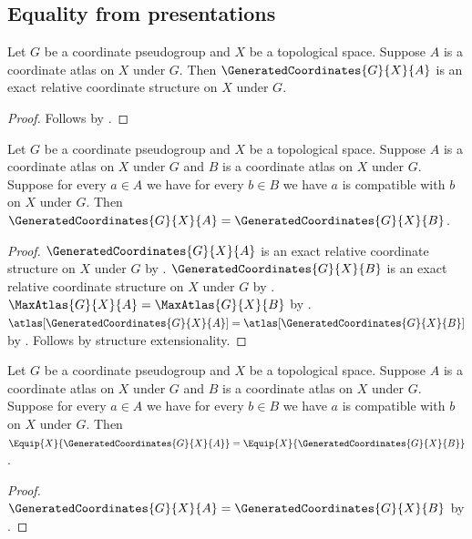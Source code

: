 \subsection{Equality from presentations}

\begin{theorem}\label{generated_coordinates_is_exact}
    Let $G$ be a coordinate pseudogroup and $X$ be a topological space.
    Suppose $A$ is a coordinate atlas on $X$ under $G$.
    Then $\GeneratedCoordinates{G}{X}{A}$ is an exact relative coordinate structure
        on $X$ under $G$.
\end{theorem}
\begin{proof}
    Follows by .
\end{proof}

\begin{theorem}\label{generated_coordinates_equal}
    Let $G$ be a coordinate pseudogroup and $X$ be a topological space.
    Suppose $A$ is a coordinate atlas on $X$ under $G$ and
        $B$ is a coordinate atlas on $X$ under $G$.
    Suppose for every $a\in A$ we have for every $b\in B$ we have
        $a$ is compatible with $b$ on $X$ under $G$.
    Then $\GeneratedCoordinates{G}{X}{A}=\GeneratedCoordinates{G}{X}{B}$.
\end{theorem}
\begin{proof}
    $\GeneratedCoordinates{G}{X}{A}$ is an exact relative coordinate structure
        on $X$ under $G$ by .
    $\GeneratedCoordinates{G}{X}{B}$ is an exact relative coordinate structure
        on $X$ under $G$ by .
    $\MaxAtlas{G}{X}{A}=\MaxAtlas{G}{X}{B}$ by .
    $\atlas[\GeneratedCoordinates{G}{X}{A}]=\atlas[\GeneratedCoordinates{G}{X}{B}]$
        by .
    Follows by structure extensionality.
\end{proof}

\begin{theorem}\label{equipped_presentations_equal}
    Let $G$ be a coordinate pseudogroup and $X$ be a topological space.
    Suppose $A$ is a coordinate atlas on $X$ under $G$ and
        $B$ is a coordinate atlas on $X$ under $G$.
    Suppose for every $a\in A$ we have for every $b\in B$ we have
        $a$ is compatible with $b$ on $X$ under $G$.
    Then $\Equip{X}{\GeneratedCoordinates{G}{X}{A}}
        =\Equip{X}{\GeneratedCoordinates{G}{X}{B}}$.
\end{theorem}
\begin{proof}
    $\GeneratedCoordinates{G}{X}{A}=\GeneratedCoordinates{G}{X}{B}$ by
        .
\end{proof}

